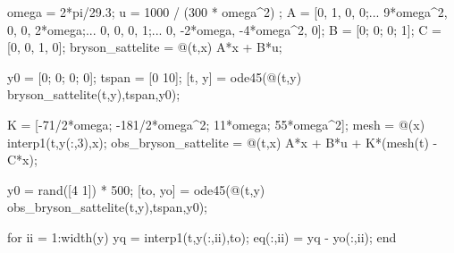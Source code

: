 
\begin{matlabcode}
omega = 2*pi/29.3; %
u = 1000 / (300 * omega^2) ; %
A = [0, 1, 0, 0;...
     9*omega^2, 0, 0, 2*omega;...
     0, 0, 0, 1;...
     0, -2*omega, -4*omega^2, 0];
B = [0; 0; 0; 1]; C = [0, 0, 1, 0];
bryson_sattelite = @(t,x) A*x + B*u;

y0 = [0; 0; 0; 0]; %
tspan = [0 10]; %
[t, y] = ode45(@(t,y) bryson_sattelite(t,y),tspan,y0);
\end{matlabcode}


\begin{matlabcode}
K = [-71/2*omega; -181/2*omega^2; 11*omega; 55*omega^2];
mesh = @(x) interp1(t,y(:,3),x);
obs_bryson_sattelite = @(t,x) A*x + B*u + K*(mesh(t) - C*x);

y0 = rand([4 1]) * 500; %
[to, yo] = ode45(@(t,y) obs_bryson_sattelite(t,y),tspan,y0); 

for ii = 1:width(y)
    yq = interp1(t,y(:,ii),to);
    eq(:,ii) = yq - yo(:,ii);
end
\end{matlabcode}